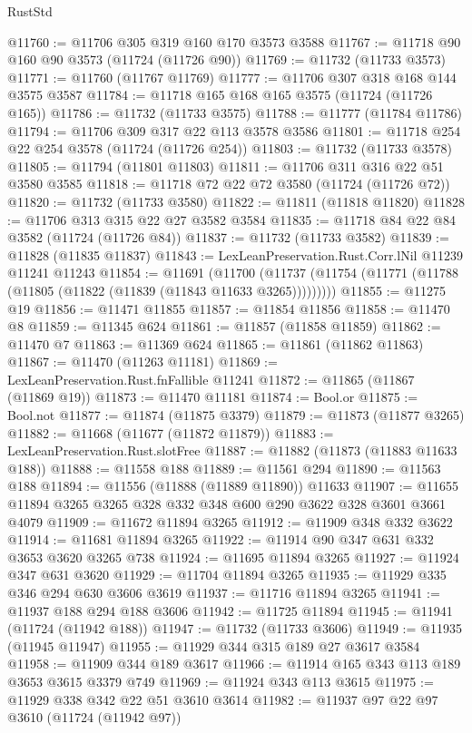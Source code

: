 \begin{lexlean}{RustStd}
\begin{coremodule}
@11760 := @11706 @305 @319 @160 @170 @3573 @3588
@11767 := @11718 @90 @160 @90 @3573 (@11724 (@11726 @90))
@11769 := @11732 (@11733 @3573)
@11771 := @11760 (@11767 @11769)
@11777 := @11706 @307 @318 @168 @144 @3575 @3587
@11784 := @11718 @165 @168 @165 @3575 (@11724 (@11726 @165))
@11786 := @11732 (@11733 @3575)
@11788 := @11777 (@11784 @11786)
@11794 := @11706 @309 @317 @22 @113 @3578 @3586
@11801 := @11718 @254 @22 @254 @3578 (@11724 (@11726 @254))
@11803 := @11732 (@11733 @3578)
@11805 := @11794 (@11801 @11803)
@11811 := @11706 @311 @316 @22 @51 @3580 @3585
@11818 := @11718 @72 @22 @72 @3580 (@11724 (@11726 @72))
@11820 := @11732 (@11733 @3580)
@11822 := @11811 (@11818 @11820)
@11828 := @11706 @313 @315 @22 @27 @3582 @3584
@11835 := @11718 @84 @22 @84 @3582 (@11724 (@11726 @84))
@11837 := @11732 (@11733 @3582)
@11839 := @11828 (@11835 @11837)
@11843 := LexLeanPreservation.Rust.Corr.lNil @11239 @11241 @11243
@11854 := @11691
    (@11700 (@11737 (@11754 (@11771 (@11788 (@11805 (@11822 (@11839 (@11843 @11633 @3265)))))))))
@11855 := @11275 @19
@11856 := @11471 @11855
@11857 := @11854 @11856
@11858 := @11470 @8
@11859 := @11345 @624
@11861 := @11857 (@11858 @11859)
@11862 := @11470 @7
@11863 := @11369 @624
@11865 := @11861 (@11862 @11863)
@11867 := @11470 (@11263 @11181)
@11869 := LexLeanPreservation.Rust.fnFallible @11241
@11872 := @11865 (@11867 (@11869 @19))
@11873 := @11470 @11181
@11874 := Bool.or
@11875 := Bool.not
@11877 := @11874 (@11875 @3379)
@11879 := @11873 (@11877 @3265)
@11882 := @11668 (@11677 (@11872 @11879))
@11883 := LexLeanPreservation.Rust.slotFree
@11887 := @11882 (@11873 (@11883 @11633 @188))
@11888 := @11558 @188
@11889 := @11561 @294
@11890 := @11563 @188
@11894 := @11556 (@11888 (@11889 @11890)) @11633
@11907 := @11655 @11894 @3265 @3265 @328 @332 @348 @600 @290 @3622 @328 @3601 @3661 @4079
@11909 := @11672 @11894 @3265
@11912 := @11909 @348 @332 @3622
@11914 := @11681 @11894 @3265
@11922 := @11914 @90 @347 @631 @332 @3653 @3620 @3265 @738
@11924 := @11695 @11894 @3265
@11927 := @11924 @347 @631 @3620
@11929 := @11704 @11894 @3265
@11935 := @11929 @335 @346 @294 @630 @3606 @3619
@11937 := @11716 @11894 @3265
@11941 := @11937 @188 @294 @188 @3606
@11942 := @11725 @11894
@11945 := @11941 (@11724 (@11942 @188))
@11947 := @11732 (@11733 @3606)
@11949 := @11935 (@11945 @11947)
@11955 := @11929 @344 @315 @189 @27 @3617 @3584
@11958 := @11909 @344 @189 @3617
@11966 := @11914 @165 @343 @113 @189 @3653 @3615 @3379 @749
@11969 := @11924 @343 @113 @3615
@11975 := @11929 @338 @342 @22 @51 @3610 @3614
@11982 := @11937 @97 @22 @97 @3610 (@11724 (@11942 @97))

\end{coremodule}
\end{lexlean}
